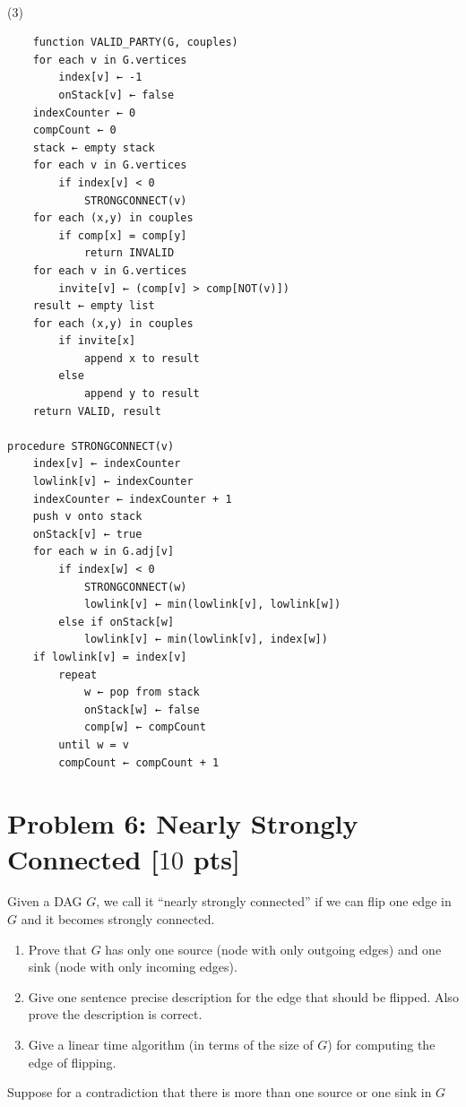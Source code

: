 \documentclass[letterpaper, 11pt]{article}
\newcommand{\1}{\mathds{1}}	%
\theoremstyle{definition}
\newcommand{\problem}[1]{\section*{Problem #1}}
\newenvironment{solution}{{\par\noindent\it Solution.}}{}
\begin{document}
\begin{solution}
\\(3)
\begin{lstlisting}
    function VALID_PARTY(G, couples)
    for each v in G.vertices
        index[v] ← -1
        onStack[v] ← false
    indexCounter ← 0
    compCount ← 0
    stack ← empty stack
    for each v in G.vertices
        if index[v] < 0
            STRONGCONNECT(v)
    for each (x,y) in couples
        if comp[x] = comp[y]
            return INVALID
    for each v in G.vertices
        invite[v] ← (comp[v] > comp[NOT(v)])
    result ← empty list
    for each (x,y) in couples
        if invite[x]
            append x to result
        else
            append y to result
    return VALID, result

procedure STRONGCONNECT(v)
    index[v] ← indexCounter
    lowlink[v] ← indexCounter
    indexCounter ← indexCounter + 1
    push v onto stack
    onStack[v] ← true
    for each w in G.adj[v]
        if index[w] < 0
            STRONGCONNECT(w)
            lowlink[v] ← min(lowlink[v], lowlink[w])
        else if onStack[w]
            lowlink[v] ← min(lowlink[v], index[w])
    if lowlink[v] = index[v]
        repeat
            w ← pop from stack
            onStack[w] ← false
            comp[w] ← compCount
        until w = v
        compCount ← compCount + 1
\end{lstlisting}
\end{solution}
\clearpage



\problem{6: Nearly Strongly Connected [$10$ pts]}
Given a DAG $G$, we call it ``nearly strongly connected'' if we can flip one edge in $G$ and it becomes strongly connected.

\begin{enumerate}
    \item Prove that $G$ has only one source (node with only outgoing edges) and one sink (node with only incoming edges).
    \item Give one sentence precise description for the edge that should be flipped. Also prove the description is correct.
    \item Give a linear time algorithm (in terms of the size of $G$) for computing the edge of flipping.
\end{enumerate}
\begin{solution}
Suppose for a contradiction that there is more than one source or one sink in $ G $ 
\end{solution}
\clearpage
\end{document}
